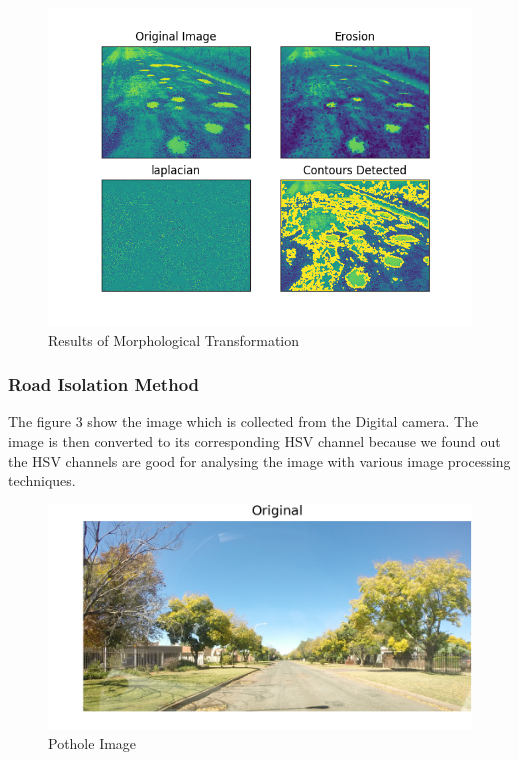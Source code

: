 \documentclass[journal]{IEEEtran}
\begin{document}
\begin{figure}[!htb]
\begin{center}
\includegraphics[scale=0.65]{Images/morph_transform_2.png}
\end{center}
\caption{Results of Morphological Transformation}
\end{figure}

\newpage

\subsubsection{Road Isolation Method}

\noindent The figure 3 show the image which is collected from the Digital camera. The image is then converted to its corresponding HSV channel because we found out the HSV channels are good for analysing the image with various image processing techniques. 

\vspace{0.5cm}

\begin{figure}[!htb]
\begin{center}
\includegraphics[scale=1]{Images/0_Original.png}
\end{center}
\caption{Pothole Image}
\end{figure}
\end{document}
